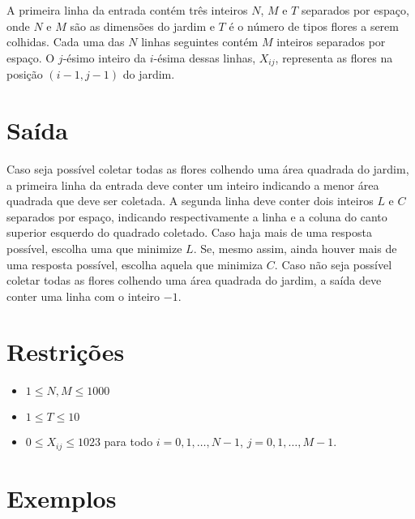 A primeira linha da entrada contém três inteiros $N$, $M$ e $T$ separados por espaço, onde $N$ e $M$ são as dimensões do jardim e $T$ é o número de tipos flores a serem colhidas. 
Cada uma das $N$ linhas seguintes contém $M$ inteiros separados por espaço. O $j$-ésimo inteiro da $i$-ésima dessas linhas, $X_{ij}$, representa as flores na posição $(i - 1, j - 1)$ do jardim.


\section*{Saída}

Caso seja possível coletar todas as flores colhendo uma área quadrada do jardim, a primeira linha da entrada deve conter um inteiro indicando a menor área quadrada que deve ser coletada. A segunda linha deve conter dois inteiros $L$ e $C$ separados por espaço, indicando respectivamente a linha e a coluna do canto superior esquerdo do quadrado coletado. Caso haja mais de uma resposta possível, escolha uma que minimize $L$. Se, mesmo assim, ainda houver mais de uma resposta possível, escolha aquela que minimiza $C$. Caso não seja possível coletar todas as flores colhendo uma área quadrada do jardim, a saída deve conter uma linha com o inteiro $-1$.

\section*{Restrições}
\begin{itemize}
\item $1 \leq N,M \leq 1000$
\item $1 \leq T \leq 10$
\item $0 \leq X_{ij} \leq 1023$ para todo $i = 0, 1, \ldots, N - 1$, $j = 0, 1, \ldots, M - 1$.
\end{itemize}
\section*{Exemplos}
\exemplo
